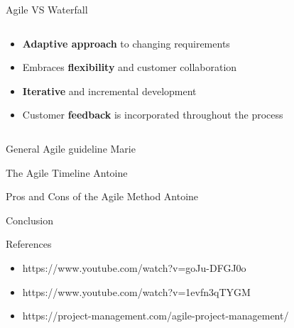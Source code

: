 \documentclass[10pt]{beamer}
\begin{document}
\begin{frame}{Agile VS Waterfall}
  \vspace{2cm}
  \begin{columns}[T]
    \begin{column}{0.5\textwidth}
      \begin{itemize}
        \item<2-> \textbf{Adaptive approach }to changing requirements
        \item<3-> Embraces \textbf{flexibility} and customer collaboration
        \item<4-> \textbf{Iterative} and incremental development
        \item<5-> Customer \textbf{feedback} is incorporated throughout the process
      \end{itemize}
    \end{column}

    \begin{column}{0.5\textwidth}
      
    \end{column}
  \end{columns}
\end{frame}


\begin{frame}{General Agile guideline}
    Marie
\end{frame}

\begin{frame}{The Agile Timeline}
    Antoine
\end{frame}

\begin{frame}{Pros and Cons of the Agile Method}
    Antoine
\end{frame}

\begin{frame}{Conclusion}
  
\end{frame}

\begin{frame}{References}

  \begin{itemize}
    \item https://www.youtube.com/watch?v=goJu-DFGJ0o
    \item https://www.youtube.com/watch?v=1evfn3qTYGM
    \item https://project-management.com/agile-project-management/
  \end{itemize}
  
\end{frame}
\end{document}
